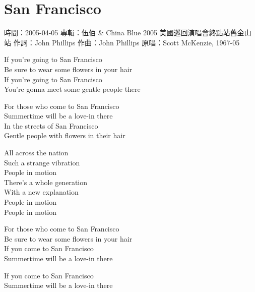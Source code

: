\documentclass[UTF8,a4paper,oneside,twocolumn,12pt]{ctexbook}
\newcommand{\infopair}[2]{\textbullet #1：#2}
\newcommand{\zc}[1][伍佰]{\infopair{作詞}{#1}}
\newcommand{\zq}[1][伍佰]{\infopair{作曲}{#1}}
\newcommand{\zj}[1]{\infopair{專輯}{#1}}
\newcommand{\yc}[1]{\infopair{原唱}{#1}}
\newcommand{\sj}[1]{\infopair{時間}{#1}}
\newenvironment{info}{\begin{flushleft}\kaishu
	}
	{\end{flushleft}\normalsize\yahei\par}
\newenvironment{lyric}{
	}
{}
\begin{document}
\section{San Francisco} %
\begin{info}
	\sj{2005-04-05} %
	\zj{伍佰 \& China Blue 2005 美國巡回演唱會終點站舊金山站}
	\zc[John Phillips]
	\zq[John Phillips]
	\yc{Scott McKenzie, 1967-05}
\end{info}
\begin{lyric}
	If you're going to San Francisco\\
	Be sure to wear some flowers in your hair\\
	If you're going to San Francisco\\
	You're gonna meet some gentle people there

	For those who come to San Francisco\\
	Summertime will be a love-in there\\
	In the streets of San Francisco\\
	Gentle people with flowers in their hair

	All across the nation\\
	Such a strange vibration\\
	People in motion\\
	There's a whole generation\\
	With a new explanation\\
	People in motion\\
	People in motion

	For those who come to San Francisco\\
	Be sure to wear some flowers in your hair\\
	If you come to San Francisco\\
	Summertime will be a love-in there

	If you come to San Francisco\\
	Summertime will be a love-in there
\end{lyric}
\end{document}
